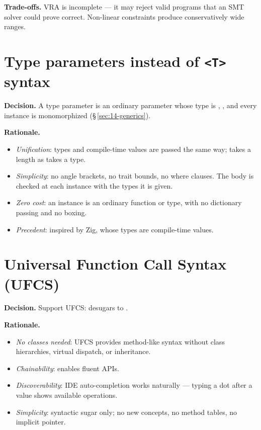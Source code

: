 \pnum
\textbf{Trade-offs.}  VRA is incomplete — it may reject valid programs
that an SMT solver could prove correct.  Non-linear constraints produce
conservatively wide ranges.

\section{Type parameters instead of \texttt{<T>} syntax}
\label{sec:rationale.comptime}

\pnum
\textbf{Decision.}  A type parameter is an ordinary parameter whose type is ,
, and every instance is monomorphized
(\S\,\ref{sec:14-generics}).

\pnum
\textbf{Rationale.}
\begin{itemize}
  \item \textit{Unification}: types and compile-time values are passed the same way;
         takes a length as  takes a type.
  \item \textit{Simplicity}: no angle brackets, no trait bounds, no where clauses.  The
        body is checked at each instance with the types it is given.
  \item \textit{Zero cost}: an instance is an ordinary function or type, with no
        dictionary passing and no boxing.
  \item \textit{Precedent}: inspired by Zig, whose types are compile-time values.
\end{itemize}

\section{Universal Function Call Syntax (UFCS)}
\label{sec:rationale.ufcs}

\pnum
\textbf{Decision.}  Support UFCS:  desugars to
.

\pnum
\textbf{Rationale.}
\begin{itemize}
  \item \textit{No classes needed}: UFCS provides method-like syntax
        without class hierarchies, virtual dispatch, or inheritance.
  \item \textit{Chainability}: enables fluent APIs.
  \item \textit{Discoverability}: IDE auto-completion works naturally —
        typing a dot after a value shows available operations.
  \item \textit{Simplicity}: syntactic sugar only; no new concepts, no
        method tables, no implicit  pointer.
\end{itemize}

